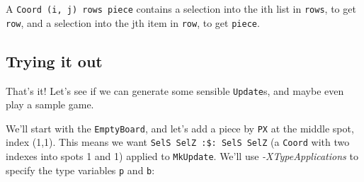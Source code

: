 \documentclass[]{article}
\newenvironment{Shaded}{}{}
\newcommand{\DataTypeTok}[1]{\textcolor[rgb]{0.56,0.13,0.00}{#1}}
\newcommand{\NormalTok}[1]{#1}
\newcommand{\OperatorTok}[1]{\textcolor[rgb]{0.40,0.40,0.40}{#1}}
\begin{document}
A \texttt{Coord\ \textquotesingle{}(i,\ j)\ rows\ piece} contains a selection
into the ith list in \texttt{rows}, to get \texttt{row}, and a selection into
the jth item in \texttt{row}, to get \texttt{piece}.

\subsection{Trying it out}\label{trying-it-out}

That's it! Let's see if we can generate some sensible \texttt{Update}s, and
maybe even play a sample game.

We'll start with the \texttt{EmptyBoard}, and let's add a piece by \texttt{PX}
at the middle spot, index (1,1). This means we want
\texttt{SelS\ SelZ\ :\$:\ SelS\ SelZ} (a \texttt{Coord} with two indexes into
spots 1 and 1) applied to \texttt{MkUpdate}. We'll use \emph{-XTypeApplications}
to specify the type variables \texttt{p} and \texttt{b}:

\begin{Shaded}
\end{Shaded}
\end{document}
